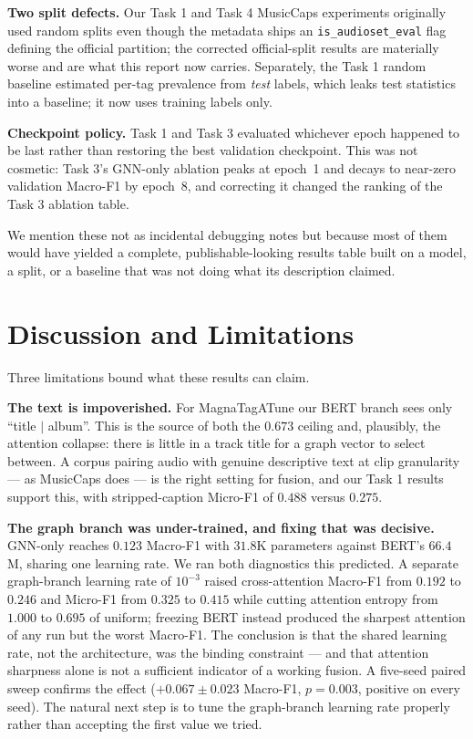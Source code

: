 \documentclass[conference]{IEEEtran}
\begin{document}
\textbf{Two split defects.} Our Task 1 and Task 4 MusicCaps experiments
originally used random splits even though the metadata ships an
\texttt{is\_audioset\_eval} flag defining the official partition; the corrected
official-split results are materially worse and are what this report now
carries. Separately, the Task 1 random baseline estimated per-tag prevalence
from \emph{test} labels, which leaks test statistics into a baseline; it now
uses training labels only.

\textbf{Checkpoint policy.} Task 1 and Task 3 evaluated whichever epoch
happened to be last rather than restoring the best validation checkpoint. This
was not cosmetic: Task 3's GNN-only ablation peaks at epoch~1 and decays to
near-zero validation Macro-F1 by epoch~8, and correcting it changed the ranking
of the Task 3 ablation table.

We mention these not as incidental debugging notes but because most of them
would have yielded a complete, publishable-looking results table built on a
model, a split, or a baseline that was not doing what its description claimed.

\section{Discussion and Limitations}

Three limitations bound what these results can claim.

\textbf{The text is impoverished.} For MagnaTagATune our BERT branch sees only
``title $\mid$ album''. This is the source of both the $0.673$ ceiling and,
plausibly, the attention collapse: there is little in a track title for a graph
vector to select between. A corpus pairing audio with genuine descriptive text
at clip granularity --- as MusicCaps does --- is the right setting for fusion,
and our Task 1 results support this, with stripped-caption Micro-F1 of
$0.488$ versus $0.275$.

\textbf{The graph branch was under-trained, and fixing that was decisive.}
GNN-only reaches $0.123$ Macro-F1 with $31.8$K parameters against BERT's
$66.4$M, sharing one learning rate. We ran both diagnostics this predicted. A
separate graph-branch learning rate of $10^{-3}$ raised cross-attention
Macro-F1 from $0.192$ to $0.246$ and Micro-F1 from $0.325$ to $0.415$ while
cutting attention entropy from $1.000$ to $0.695$ of uniform; freezing BERT
instead produced the sharpest attention of any run but the worst Macro-F1. The
conclusion is that the shared learning rate, not the architecture, was the
binding constraint --- and that attention sharpness alone is not a sufficient
indicator of a working fusion. A five-seed paired sweep confirms the effect
($+0.067 \pm 0.023$ Macro-F1, $p = 0.003$, positive on every seed). The natural
next step is to tune the graph-branch learning rate properly rather than
accepting the first value we tried.
\end{document}
